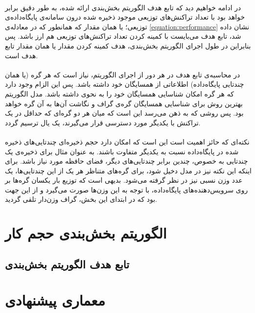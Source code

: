 \paragraph*{}
در ادامه خواهیم دید که تابع هدف الگوریتم بخش‌بندی ارائه شده، به طور دقیق برابر خواهد بود با تعداد تراکنش‌های توزیعی موجود ذخیره شده درون سامانه‌ی پایگاه‌داده‌ی توزیعی؛ یا همان مقدار
\lr{$ |\distributedTransactions| $}
که همانطور که در معادله‌ی
\ref{equation:performance}
نشان داده شد، تابع هدف می‌بایست با کمینه کردن تعداد تراکنش‌های توزیعی هم ارز باشد. پس بنابراین در طول اجرای الگوریتم بخش‌بندی، هدف کمینه کردن مقدار
\lr{$ |\distributedTransactions| $}
یا همان مقدار تابع هدف است.

\paragraph*{}
در محاسبه‌ی تابع هدف در هر دور از اجرای الگوریتم، نیاز است که هر گره (یا همان چندتایی پایگاه‌داده) اطلاعاتی از همسایگان خود داشته باشد. پس این الزام وجود دارد که هر گره امکان شناسایی همسایگان خود را به نحوی داشته باشد. مدل الگوریتم بهترین روش برای شناسایی همسایگان گره‌ی گراف و نگاشت آن‌ها به آن گره خواهد بود. پس روشی که به ذهن می‌رسد این است که میان هر دو گره‌ای که حداقل در یک تراکنش با یکدیگر مورد دسترسی قرار می‌گیرند، یک یال ترسیم گردد.

\paragraph*{}
نکته‌ای که حائز اهمیت است این است که امکان دارد حجم ذخیره‌ای چندتایی‌های ذخیره شده در پایگاه‌داده نسبت به یکدیگر متفاوت باشند. به عنوان مثال برای ذخیره‌ی یک چندتایی به خصوص، چندین برابر چندتایی‌های دیگر، فضای حافظه مورد نیاز باشد. برای اینکه این نکته نیز در مدل دخیل شود، برای گره‌های متناظر هر یک از این چندتایی‌ها، یک عدد وزن نسبی نیز در نظر گرفته می‌شود. بدیهی است که توزیع بار یکسان گره‌ها بر روی سرویس‌دهنده‌های پایگاه‌داده، با توجه به این وزن‌ها صورت می‌گیرد و از این جهت بود که در ابتدای این بخش، گراف وزن‌دار تلقی گردید.


\section{الگوریتم بخش‌بندی حجم کار}
\subsection{تابع هدف الگوریتم بخش‌بندی}

\section{معماری پیشنهادی}